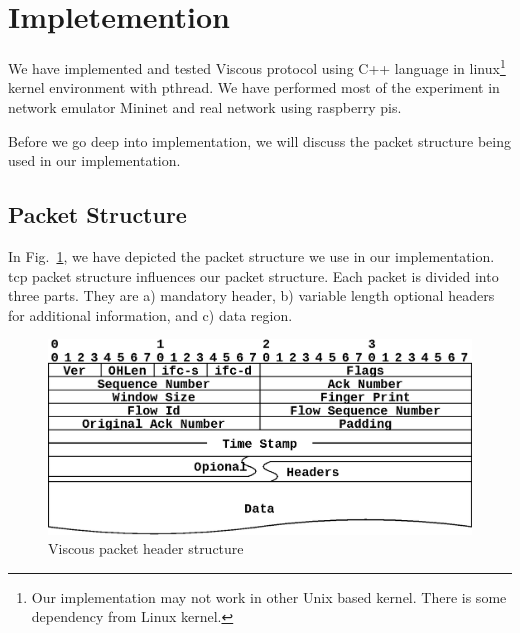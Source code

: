 \section{Impletemention}
We have implemented and tested Viscous protocol using C++ language in linux\footnote{Our implementation may not work in other Unix based kernel. There is some dependency from Linux kernel.} kernel environment with pthread. We have performed most of the experiment in network emulator Mininet and real network using raspberry pis. 

Before we go deep into implementation, we will discuss the packet structure being used in our implementation.

\subsection{Packet Structure}
In Fig.~\ref{fig:packet_format}, we have depicted the packet structure we use in our implementation. \acrshort{tcp} packet structure influences our packet structure. Each packet is divided into three parts. They are a) mandatory header, b) variable length optional headers for additional information, and c) data region.

\begin{figure}[h!]
    \centering
    \includegraphics[width=1\linewidth]{img/Packet_format.eps}
    \caption{Viscous packet header structure}
    \label{fig:packet_format}
\end{figure}
